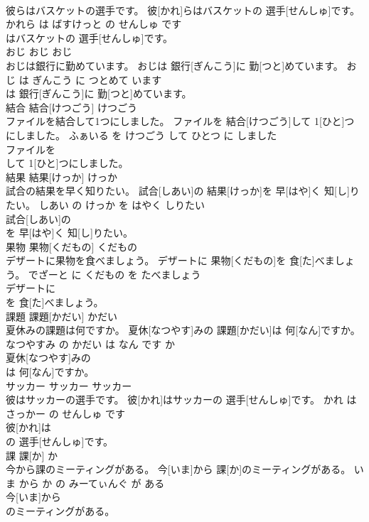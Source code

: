 \documentclass[8pt]{extreport}
\begin{document}
\begin{CJK}{UTF8}{min}
\\	彼らはバスケットの選手です。	彼[かれ]らはバスケットの 選手[せんしゅ]です。	かれら は ばすけっと の せんしゅ です	
\\	はバスケットの 選手[せんしゅ]です。		
\\	おじ	おじ	おじ	
\\	おじは銀行に勤めています。	おじは 銀行[ぎんこう]に 勤[つと]めています。	おじ は ぎんこう に つとめて います	
\\	は 銀行[ぎんこう]に 勤[つと]めています。		
\\	結合	結合[けつごう]	けつごう	
\\	ファイルを結合して1つにしました。	ファイルを 結合[けつごう]して 1[ひと]つにしました。	ふぁいる を けつごう して ひとつ に しました	
\\	ファイルを
\\	して 1[ひと]つにしました。		
\\	結果	結果[けっか]	けっか	
\\	試合の結果を早く知りたい。	試合[しあい]の 結果[けっか]を 早[はや]く 知[し]りたい。	しあい の けっか を はやく しりたい	
\\	試合[しあい]の
\\	を 早[はや]く 知[し]りたい。		
\\	果物	果物[くだもの]	くだもの	
\\	デザートに果物を食べましょう。	デザートに 果物[くだもの]を 食[た]べましょう。	でざーと に くだもの を たべましょう	
\\	デザートに
\\	を 食[た]べましょう。		
\\	課題	課題[かだい]	かだい	
\\	夏休みの課題は何ですか。	夏休[なつやす]みの 課題[かだい]は 何[なん]ですか。	なつやすみ の かだい は なん です か	
\\	夏休[なつやす]みの
\\	は 何[なん]ですか。		
\\	サッカー	サッカー	サッカー	
\\	彼はサッカーの選手です。	彼[かれ]はサッカーの 選手[せんしゅ]です。	かれ は さっかー の せんしゅ です	
\\	彼[かれ]は
\\	の 選手[せんしゅ]です。		
\\	課	課[か]	か	
\\	今から課のミーティングがある。	今[いま]から 課[か]のミーティングがある。	いま から か の みーてぃんぐ が ある	
\\	今[いま]から
\\	のミーティングがある。		

\end{CJK}
\end{document}
